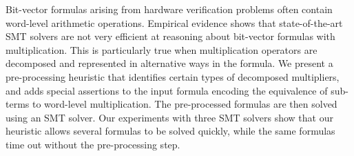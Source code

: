 %
%
Bit-vector formulas arising from hardware verification problems often
contain word-level arithmetic operations.  Empirical evidence shows
that state-of-the-art SMT solvers are not very efficient at reasoning about
bit-vector formulas with multiplication.  This is particularly true
when multiplication operators are decomposed and represented in
alternative ways in the formula. %
%
%
We present a pre-processing heuristic that identifies certain types of
decomposed multipliers, and adds special assertions to the input
formula encoding the equivalence of sub-terms to word-level
multiplication.  The pre-processed formulas are then solved using an
SMT solver.  Our experiments with three  SMT solvers
show that our heuristic allows several formulas to be solved quickly,
while the same formulas time out without the pre-processing step.
%


